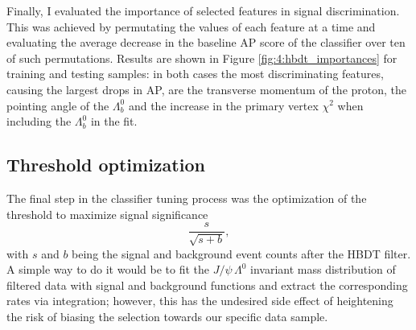 Finally, I evaluated the importance of selected features in signal discrimination.
This was achieved by permutating the values of each feature at a time and evaluating the average decrease in the baseline AP score of the classifier over ten of such permutations.
Results are shown in Figure \ref{fig:4:hbdt_importances} for training and testing samples:
in both cases the most discriminating features, causing the largest drops in AP, are the transverse momentum of the proton, the pointing angle of the $\Lambda_b^0$ and the increase in the primary vertex $\chi^2$ when including the $\Lambda_b^0$ in the fit.

\subsection{Threshold optimization}
\label{sec:4:threshold_optimization}

The final step in the classifier tuning process was the optimization of the threshold to maximize signal significance
\begin{equation}
\frac{s}{\sqrt{s+b}},
\label{eq:4:signal_significance}
\end{equation}
with $s$ and $b$ being the signal and background event counts after the HBDT filter.
A simple way to do it would be to fit the $J/\psi\,\Lambda^0$ invariant mass distribution of filtered data with signal and background functions and extract the corresponding rates via integration;
however, this has the undesired side effect of heightening the risk of biasing the selection towards our specific data sample.

